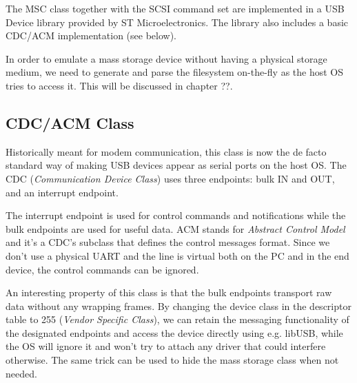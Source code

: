 




The MSC class together with the SCSI command set are implemented in a USB Device library provided by ST Microelectronics. The library also includes a basic CDC/ACM implementation (see below).

In order to emulate a mass storage device without having a physical storage medium, we need to generate and parse the filesystem on-the-fly as the host OS tries to access it. This will be discussed in chapter ??.

\subsection{CDC/ACM Class} \label{sec:cdc-acm}


Historically meant for modem communication, this class is now the de facto standard way of making USB devices appear as serial ports on the host OS. The CDC (\textit{Communication Device Class}) uses three endpoints: bulk IN and OUT, and an interrupt endpoint. 

The interrupt endpoint is used for control commands and notifications while the bulk endpoints are used for useful data. ACM stands for \textit{Abstract Control Model} and it's a CDC's subclass that defines the control messages format. Since we don't use a physical UART and the line is virtual both on the PC and in the end device, the control commands can be ignored.

An interesting property of this class is that the bulk endpoints transport raw data without any wrapping frames. By changing the device class in the descriptor table to 255 (\textit{Vendor Specific Class}), we can retain the messaging functionality of the designated endpoints and access the device directly using e.g. libUSB, while the OS will ignore it and won't try to attach any driver that could interfere otherwise. The same trick can be used to hide the mass storage class when not needed.

